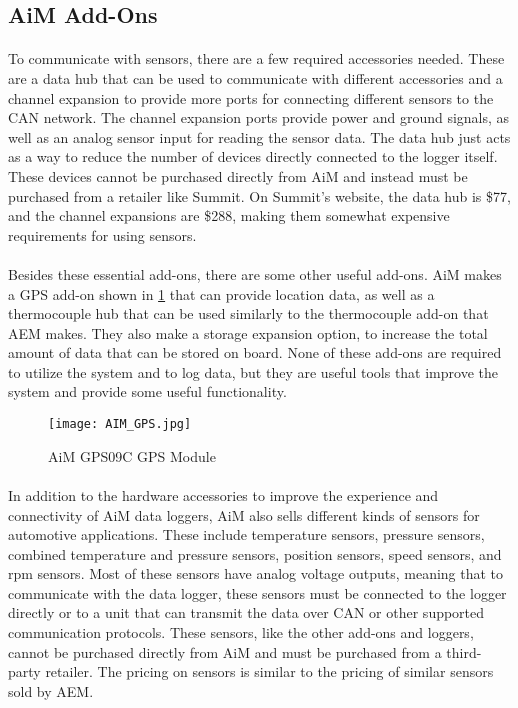 \subsection{AiM Add-Ons}

\paragraph{}
To communicate with sensors, there are a few required accessories needed.
These are a data hub that can be used to communicate with different accessories and a channel expansion to provide more ports for connecting different sensors to the CAN network.
The channel expansion ports provide power and ground signals, as well as an analog sensor input for reading the sensor data.
The data hub just acts as a way to reduce the number of devices directly connected to the logger itself.
These devices cannot be purchased directly from AiM and instead must be purchased from a retailer like Summit.
On Summit's website, the data hub is \$77, and the channel expansions are \$288, making them somewhat expensive requirements for using sensors.

\paragraph{}
Besides these essential add-ons, there are some other useful add-ons.
AiM makes a GPS add-on shown in \cref{fig:AIM_GPS} that can provide location data, as well as a thermocouple hub that can be used similarly to the thermocouple add-on that AEM makes.
They also make a storage expansion option, to increase the total amount of data that can be stored on board.
None of these add-ons are required to utilize the system and to log data, but they are useful tools that improve the system and provide some useful functionality.

\begin{figure}[H]
	\centering
	\texttt{[image: AIM\_GPS.jpg]}
	\caption{AiM GPS09C GPS Module}
	\label{fig:AIM_GPS}
\end{figure}

\paragraph{}
In addition to the hardware accessories to improve the experience and connectivity of AiM data loggers, AiM also sells different kinds of sensors for automotive applications.
These include temperature sensors, pressure sensors, combined temperature and pressure sensors, position sensors, speed sensors, and rpm sensors.
Most of these sensors have analog voltage outputs, meaning that to communicate with the data logger, these sensors must be connected to the logger directly or to a unit that can transmit the data over CAN or other supported communication protocols.
These sensors, like the other add-ons and loggers, cannot be purchased directly from AiM and must be purchased from a third-party retailer.
The pricing on sensors is similar to the pricing of similar sensors sold by AEM.

